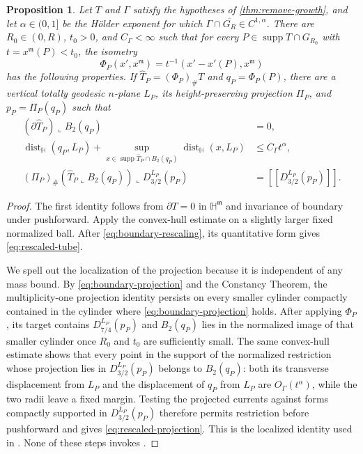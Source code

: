 \documentclass[11pt,reqno]{amsart}
\numberwithin{equation}{section}
\newtheorem{proposition}[proposition]{Proposition}
\theoremstyle{definition}
\theoremstyle{remark}
\newcommand{\Hyp}{\mathbb H}
\newcommand{\supp}{\operatorname{supp}}
\newcommand{\dist}{\operatorname{dist}}
\newcommand{\restr}{\mathbin{\llcorner}}
\newcommand{\cur}[1]{\left[\!\left[#1\right]\!\right]}
\begin{document}
\begin{proposition}\label{prop:boundary-localization}
Let $T$ and $\Gamma$ satisfy the hypotheses of
\cref{thm:remove-growth}, and let $\alpha\in(0,1]$ be the
Hölder exponent for which
$\Gamma\cap\overline{G_R}\in C^{1,\alpha}$.  There are $R_0\in(0,R)$,
$t_0>0$, and $C_\Gamma<\infty$ such that for every
$P\in\supp T\cap G_{R_0}$ with $t=x^{\mathfrak m}(P)<t_0$, the isometry
\begin{equation}\label{eq:boundary-rescaling}
 \Phi_P(x',x^{\mathfrak m})
 =t^{-1}(x'-x'(P),x^{\mathfrak m})
\end{equation}
has the following properties.  If $\widehat T_P=(\Phi_P)_\#T$ and
$q_P=\Phi_P(P)$, there are a vertical totally geodesic $n$-plane $L_P$, its
height-preserving projection $\Pi_P$, and $p_P=\Pi_P(q_P)$ such that
\begin{align}
 (\partial\widehat T_P)\restr B_2(q_P)&=0,
 \label{eq:rescaled-no-boundary}\\
 \dist_{\Hyp}(q_P,L_P)+
 \sup_{x\in\supp\widehat T_P\cap B_2(q_P)}\dist_{\Hyp}(x,L_P)
 &\le C_\Gamma t^\alpha,\label{eq:rescaled-tube}\\
 (\Pi_P)_\#(\widehat T_P\restr B_2(q_P))
 \restr D_{3/2}^{L_P}(p_P)
 &=\cur{D_{3/2}^{L_P}(p_P)}.\label{eq:rescaled-projection}
\end{align}
\end{proposition}

\begin{proof}
The first identity follows from $\partial T=0$ in $\Hyp^{\mathfrak m}$ and
invariance of boundary under pushforward.  Apply the convex-hull estimate
\cite[(2.8)]{JiangXie} on a slightly larger fixed normalized ball.  After
\eqref{eq:boundary-rescaling}, its quantitative form
\cite[(3.30)]{JiangXie} gives
\eqref{eq:rescaled-tube}.

We spell out the localization of the projection because it is independent of
any mass bound.  By \eqref{eq:boundary-projection} and the Constancy Theorem, the
multiplicity-one projection identity persists on every smaller cylinder
compactly contained in the cylinder where \eqref{eq:boundary-projection} holds.
After applying $\Phi_P$, its target contains
$D_{7/4}^{L_P}(p_P)$ and $B_2(q_P)$ lies in the normalized image of that
smaller cylinder once $R_0$ and $t_0$ are sufficiently small.  The same
convex-hull estimate shows that every point in the support of the normalized
restriction whose projection lies in $D_{3/2}^{L_P}(p_P)$ belongs to
$B_2(q_P)$: both its transverse displacement from $L_P$ and the displacement
of $q_P$ from $L_P$ are $O_\Gamma(t^\alpha)$, while the two radii leave a
fixed margin.  Testing the projected currents against forms compactly
supported in $D_{3/2}^{L_P}(p_P)$ therefore permits restriction before
pushforward and gives \eqref{eq:rescaled-projection}.  This is the
localized identity used in \cite[(3.15)]{JiangXie}.  None of these steps
invokes
\cite[(1.10)]{JiangXie}.
\end{proof}
\end{document}

